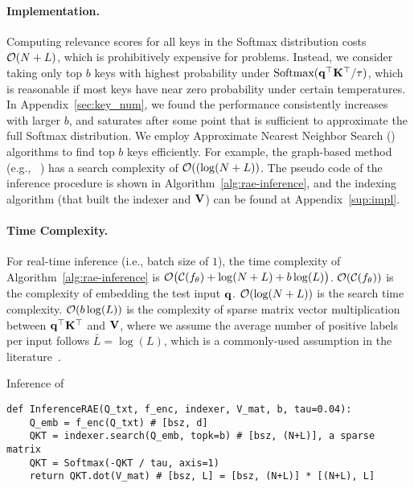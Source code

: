 \paragraph{Implementation.}
Computing relevance scores for all keys in the Softmax distribution costs ${\mathcal{O}}(N+L)$,
which is prohibitively expensive for \XMC problems.
Instead, we consider taking only top $b$ keys with highest probability under $\text{Softmax}({\mathbf{q}}^\top {\mathbf{K}}^\top/\tau)$,
which is reasonable if most keys have near zero probability under certain temperatures.
In Appendix~\ref{sec:key_num}, we found the performance consistently increases with larger $b$, and saturates after some point that is sufficient to approximate the full Softmax distribution.
We employ Approximate Nearest Neighbor Search (\ANN) algorithms to find top $b$ keys efficiently.
For example, the graph-based \ANN method (e.g., \HNSWLIB~\citep{malkov2018efficient}) has a search complexity of ${\mathcal{O}}((\log(N + L))$.
The pseudo code of the inference procedure is shown in Algorithm~\ref{alg:rae-inference}, and the indexing algorithm (that built the indexer and ${\mathbf{V}}$) can be found at Appendix~\ref{sup:impl}.

\paragraph{Time Complexity.}
For real-time inference (i.e., batch size of $1$), the time complexity of Algorithm~\ref{alg:rae-inference} is
${\mathcal{O}}\big({\mathcal{C}}(f_\theta) + \log(N+L) + b\log(L)\big)$.
${\mathcal{O}}({\mathcal{C}}(f_\theta))$ is the complexity of embedding the test input ${\mathbf{q}}$.
${\mathcal{O}}(\log(N+L))$ is the \ANN search time complexity.
${\mathcal{O}}(b\log(L))$ is the complexity of sparse matrix vector multiplication between ${\mathbf{q}}^{\top}{\mathbf{K}}^{\top}$ and ${\mathbf{V}}$,
where we assume the average number of positive labels per input follows $\bar{L}=\log(L)$,
which is a commonly-used assumption in the \XMC literature~\citep{yen2016pd,prabhu2018parabel}.

\begin{algorithm}[H]
    \caption{Inference of \RAEXMC}
    \label{alg:rae-inference}
    \begin{verbatim}
def InferenceRAE(Q_txt, f_enc, indexer, V_mat, b, tau=0.04):
    Q_emb = f_enc(Q_txt) # [bsz, d]
    QKT = indexer.search(Q_emb, topk=b) # [bsz, (N+L)], a sparse matrix
    QKT = Softmax(-QKT / tau, axis=1)
    return QKT.dot(V_mat) # [bsz, L] = [bsz, (N+L)] * [(N+L), L]
    \end{verbatim}
\end{algorithm}

